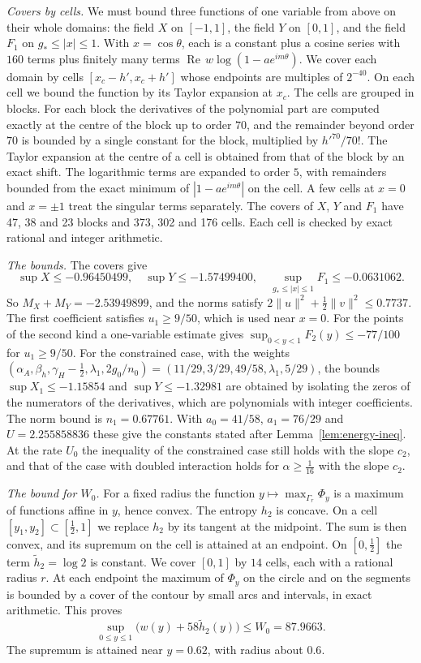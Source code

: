 \documentclass[11pt]{amsart}
\newcommand{\WZero}{87.9663}
\newcommand{\Utarget}{2.255858836}
\newcommand{\SupX}{-0.96450499}
\newcommand{\SupY}{-1.57499400}
\newcommand{\FieldCap}{-2.53949899}
\newcommand{\ResCap}{-0.0631062}
\newcommand{\Kcoef}{160}
\newcommand{\Nblocks}{47, 38 and 23}
\newcommand{\Ncells}{373, 302 and 176}
\theoremstyle{definition}
\theoremstyle{remark}
\numberwithin{equation}{section}
\begin{document}
\emph{Covers by cells.} We must bound three functions of one variable from above on their whole domains: the
field $X$ on $[-1,1]$, the field $Y$ on $[0,1]$, and the field $F_1$ on $g_*\le|x|\le1$. With $x=\cos\theta$,
each is a constant plus a cosine series with $\Kcoef$ terms plus finitely many terms
$\operatorname{Re}\,w\log(1-ae^{im\theta})$. We cover each domain by cells $[x_c-h',x_c+h']$ whose endpoints are
multiples of $2^{-40}$. On each cell we bound the function by its Taylor expansion at $x_c$. The cells are
grouped in blocks. For each block the derivatives of the polynomial part are computed exactly at the centre
of the block up to order $70$, and the remainder beyond order $70$ is bounded by a single constant for the
block, multiplied by $h'^{70}/70!$. The Taylor expansion at the centre of a cell is obtained from that of the
block by an exact shift. The logarithmic terms are expanded to order $5$, with remainders bounded from the
exact minimum of $|1-ae^{im\theta}|$ on the cell. A few cells at $x=0$ and $x=\pm1$ treat the singular terms
separately. The covers of $X$, $Y$ and $F_1$ have \Nblocks{} blocks and \Ncells{} cells. Each cell is
checked by exact rational and integer arithmetic.

\emph{The bounds.} The covers give
\[
 \sup X\le\SupX,\quad \sup Y\le\SupY,\quad \sup_{g_*\le|x|\le1}F_1\le\ResCap .
\]
So $M_X+M_Y=\FieldCap$, and the norms satisfy $2\|u\|^2+\frac12\|v\|^2\le0.7737$. The first coefficient satisfies
$u_1\ge9/50$, which is used near $x=0$. For the points of the second kind a one-variable estimate gives
$\sup_{0<y<1}F_2(y)\le-77/100$ for $u_1\ge9/50$. For the constrained case, with the weights
$(\alpha_A,\beta_h,\gamma_H-\frac12,\lambda_1,2g_0/n_0)=(11/29,3/29,49/58,\lambda_1,5/29)$, the bounds
$\sup X_1\le-1.15854$ and $\sup Y\le-1.32981$ are obtained by isolating the zeros of the numerators of the
derivatives, which are polynomials with integer coefficients. The norm bound is $n_1=0.67761$. With $a_0=41/58$,
$a_1=76/29$ and $U=\Utarget$ these give the constants stated after Lemma~\ref{lem:energy-ineq}. At the rate $U_0$
the inequality of the constrained case still holds with the slope $c_2$, and that of the case with doubled
interaction holds for $\alpha\ge\frac1{16}$ with the slope $c_2$.

\emph{The bound for $W_0$.} For a fixed radius the function $y\mapsto\max_{\Gamma_r}\Phi_y$ is a maximum of
functions affine in $y$, hence convex. The entropy $h_2$ is concave. On a cell $[y_1,y_2]\subset[\frac12,1]$ we
replace $h_2$ by its tangent at the midpoint. The sum is then convex, and its supremum on the cell is
attained at an endpoint. On $[0,\frac12]$ the term $\tilde h_2=\log2$ is constant. We cover $[0,1]$ by $14$
cells, each with a rational radius $r$. At each endpoint the maximum of $\Phi_y$ on the circle and on the
segments is bounded by a cover of the contour by small arcs and intervals, in exact arithmetic. This proves
\[
 \sup_{0\le y\le1}\bigl(w(y)+58\tilde h_2(y)\bigr)\le W_0=\WZero .
\]
The supremum is attained near $y=0.62$, with radius about $0.6$.
\end{document}
